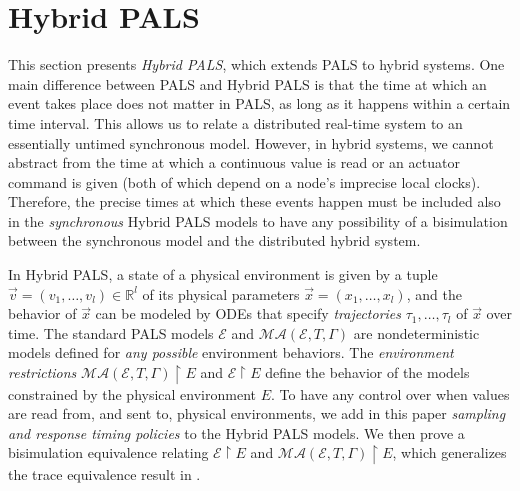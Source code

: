 
\section{Hybrid PALS}
\label{sec:hybrid-pals}



This section presents \emph{Hybrid PALS}, which extends PALS to hybrid
systems.  One main difference between PALS and Hybrid PALS is that
 the time at which an event takes place does not matter in PALS, as
long as it happens within a certain time interval. This
 allows us to relate a distributed
real-time system to an essentially untimed synchronous model. However,
in hybrid systems, we cannot abstract from the time at which a
continuous value is read or  an actuator command is given
(both of which depend on a node's imprecise local clocks). Therefore,
the precise times at which these events happen must be included also
in the \emph{synchronous} Hybrid PALS models to have any possibility
of a bisimulation between the synchronous model and the distributed
hybrid system. 


In Hybrid PALS, a  state of a physical environment %
is given by 
a tuple $\vec{v} = (v_1,\ldots,v_l) \in \mathbb{R}^l$ 
of its physical parameters $\vec{x} = (x_1, \ldots,x_l)$,
and
the behavior of %
$\vec{x}$
can be modeled by ODEs that specify \emph{trajectories} 
$\tau_1, \ldots, \tau_l$ of %
$\vec{x}$ over time.
%
The standard PALS models $\mathcal{E}$ and $\mathcal{MA}(\mathcal{E},T,\Gamma)$ 
are  nondeterministic models defined for \emph{any possible} environment behaviors.
The \emph{environment restrictions} 
$\mathcal{MA}(\mathcal{E},T,\Gamma)\restriction E$
and
$\mathcal{E} \restriction E$
 define the behavior of the models 
 constrained by the physical  environment $E$.  To have any
 control over when values are read from, and sent to, physical environments, we add in this paper \emph{sampling and
   response timing policies} to the Hybrid PALS models. 
We then  
prove a bisimulation equivalence 
relating $\mathcal{E}\restriction E$ and $\mathcal{MA}(\mathcal{E}, T,\Gamma)\restriction E$,
which generalizes the  trace equivalence result in \cite{hybrid-pals}.



